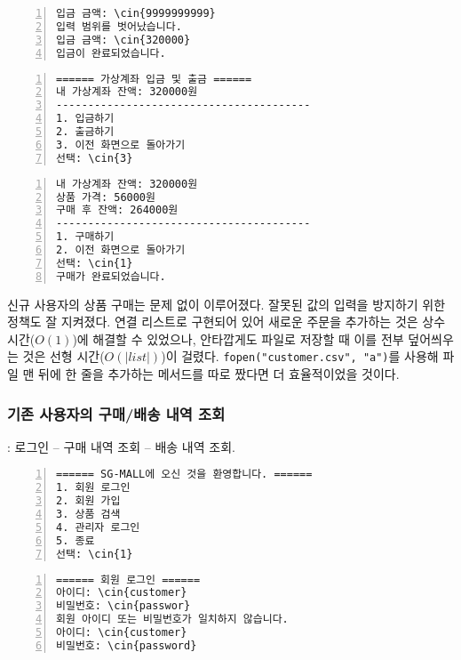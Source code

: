 \documentclass[runningheads]{llncs}
\newcommand{\cin}[1]{\textbf{\textcolor{orange}{#1}}}
\begin{document}
\begin{Verbatim}[frame=single,numbers=left,commandchars=\\\{\}]
입금 금액: \cin{9999999999}
입력 범위를 벗어났습니다.
입금 금액: \cin{320000}
입금이 완료되었습니다.
\end{Verbatim}

\begin{Verbatim}[frame=single,numbers=left,commandchars=\\\{\}]
====== 가상계좌 입금 및 출금 ======
내 가상계좌 잔액: 320000원
----------------------------------------
1. 입금하기
2. 출금하기
3. 이전 화면으로 돌아가기
선택: \cin{3}
\end{Verbatim}

\begin{Verbatim}[frame=single,numbers=left,commandchars=\\\{\}]
내 가상계좌 잔액: 320000원
상품 가격: 56000원
구매 후 잔액: 264000원
----------------------------------------
1. 구매하기
2. 이전 화면으로 돌아가기
선택: \cin{1}
구매가 완료되었습니다.
\end{Verbatim}

신규 사용자의 상품 구매는 문제 없이 이루어졌다. 잘못된 값의 입력을 방지하기 위한 정책도 잘 지켜졌다. 연결 리스트로 구현되어 있어 새로운 주문을 추가하는 것은 상수 시간($O(1)$)에 해결할 수 있었으나, 안타깝게도 파일로 저장할 때 이를 전부 덮어씌우는 것은 선형 시간($O(|list|)$)이 걸렸다. \texttt{fopen("customer.csv", "a")}를 사용해 파일 맨 뒤에 한 줄을 추가하는 메서드를 따로 짰다면 더 효율적이었을 것이다.

\subsubsection{기존 사용자의 구매/배송 내역 조회}: 로그인 -- 구매 내역 조회 -- 배송 내역 조회.

\begin{Verbatim}[frame=single,numbers=left,commandchars=\\\{\}]
====== SG-MALL에 오신 것을 환영합니다. ======
1. 회원 로그인
2. 회원 가입
3. 상품 검색
4. 관리자 로그인
5. 종료
선택: \cin{1}
\end{Verbatim}

\begin{Verbatim}[frame=single,numbers=left,commandchars=\\\{\}]
====== 회원 로그인 ======
아이디: \cin{customer}
비밀번호: \cin{passwor}
회원 아이디 또는 비밀번호가 일치하지 않습니다.
아이디: \cin{customer}
비밀번호: \cin{password}
\end{Verbatim}
\end{document}
